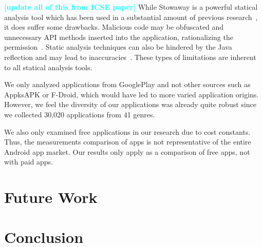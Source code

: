 \documentclass{sig-alternate}
\newcommand{\todo}[1]{\textcolor{cyan}{\textbf{[#1]}}}
\begin{document}
\todo{update all of this from ICSE paper}
While Stowaway is a powerful statical analysis tool which has been used in a substantial amount of previous research~\cite{Pearce:2012:APS:2414456.2414498,Stevens_investigatinguser,jeon2011dr}, it does suffer some drawbacks. Malicious code may be obfuscated and unnecessary API methods inserted into the application, rationalizing the permission~\cite{6698893}. Static analysis techniques can also be hindered by the Java reflection and may lead to inaccuracies~\cite{Sridharan:2006:RCP:1133255.1134027,Tripp:2009:TET:1542476.1542486}. These types of limitations are inherent to all statical analysis tools.

We only analyzed applications from GooglePlay and not other sources such as AppksAPK or F-Droid, which would have led to more varied application origins. However, we feel the diversity of our applications was already quite robust since we collected 30,020 applications from 41 genres.

We also only examined free applications in our research due to cost constants. Thus, the measurements comparison of apps is not representative of the entire Android app market. Our results only apply as a comparison of free apps, not with paid apps.






\section{Future Work}
\label{sec: futurework}

%


\section{Conclusion}
\label{sec: conclusion}





\balance



\balancecolumns
\end{document}

